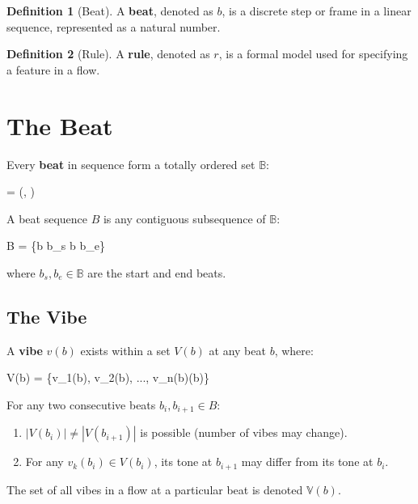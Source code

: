 \documentclass{article}
\let\oldequation\equation
\let\endoldequation\endequation
\renewenvironment{equation}{%
    \noindent\vspace{-\parskip}\vspace{-\baselineskip}%
    \oldequation
}{%
    \endoldequation
    \noindent\vspace{-\parskip}\vspace{-\baselineskip}%
}
\theoremstyle{definition}
\theoremstyle{axiom}
\theoremstyle{theorem}
\theoremstyle{lemma}
\theoremstyle{proposition}
\newtheorem{definition}{Definition}      %
\begin{document}
\begin{definition}[Beat]
A \textbf{beat}, denoted as $b$, is a discrete step or frame in a linear sequence, represented as a natural number.
\end{definition}

\begin{definition}[Rule]
A \textbf{rule}, denoted as $r$, is a formal model used for specifying a feature in a flow.
\end{definition}

\section{The Beat}

Every \textbf{beat} in sequence form a totally ordered set $\mathbb{B}$:

\begin{equation}
     = (, \leq)
\end{equation}

A beat sequence $B$ is any contiguous subsequence of $\mathbb{B}$:

\begin{equation}
    B = \{b \in {} \mid b_s \leq b \leq b_e\}
\end{equation}

where $b_s, b_e \in \mathbb{B}$ are the start and end beats.

\subsection{The Vibe}

A \textbf{vibe} $v(b)$ exists within a set $V(b)$ at any beat $b$, where:

\begin{equation}
    V(b) = \{v_1(b), v_2(b), ..., v_{n(b)}(b)\}
\end{equation}

For any two consecutive beats $b_i, b_{i+1} \in B$:

\begin{enumerate}
    \item $|V(b_i)| \neq |V(b_{i+1})|$ is possible (number of vibes may change).
    \item For any $v_k(b_i) \in V(b_i)$, its tone at $b_{i+1}$ may differ from its tone at $b_i$.
\end{enumerate}

The set of all vibes in a flow at a particular beat is denoted $\mathbb{V}(b)$.
\end{document}
